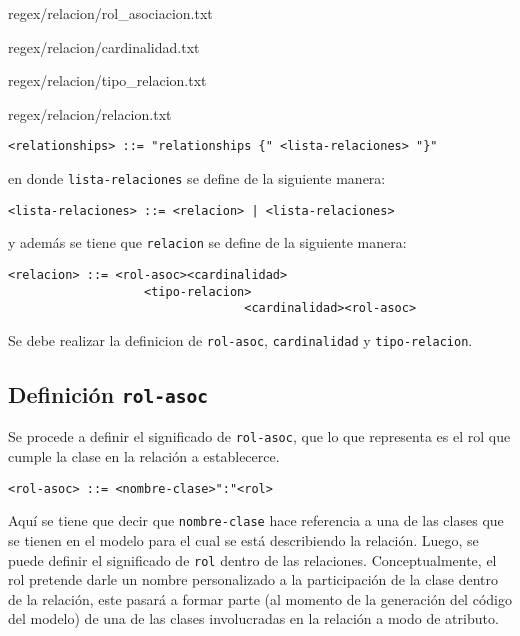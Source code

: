 \begin{lstinputlisting}[basicstyle=\footnotesize\ttfamily, caption={Regex -
  Nombre clase (+Rol) [Relación]},
  label=rerenomclase]{regex/relacion/rol_asociacion.txt}
\begin{lstinputlisting}[basicstyle=\footnotesize\ttfamily, caption={Regex -
  Cardinalidad [Relación]}, label=rerecard]{regex/relacion/cardinalidad.txt}
\begin{lstinputlisting}[basicstyle=\footnotesize\ttfamily, caption={Regex -
  Tipo de Relación [Relación]},
  label=reretiprel]{regex/relacion/tipo_relacion.txt}
\begin{lstinputlisting}[basicstyle=\footnotesize\ttfamily, caption={Regex -
  Relacion},
  label=rerelacion]{regex/relacion/relacion.txt}
\begin{lstlisting}[caption={BNF - Relationships}, basicstyle=\footnotesize\ttfamily]
  <relationships> ::= "relationships {" <lista-relaciones> "}"
\end{lstlisting}

en donde \texttt{lista-relaciones} se define de la siguiente manera:

\begin{lstlisting}[basicstyle=\footnotesize\ttfamily]
  <lista-relaciones> ::= <relacion> | <lista-relaciones>
\end{lstlisting}

y además se tiene que \texttt{relacion} se define de la siguiente manera:

\begin{lstlisting}[caption={BNF - Relación}, basicstyle=\footnotesize\ttfamily]
	<relacion> ::= <rol-asoc><cardinalidad>
	               <tipo-relacion>
								 <cardinalidad><rol-asoc>
\end{lstlisting}

Se debe realizar la definicion de \texttt{rol-asoc}, \texttt{cardinalidad} y
\texttt{tipo-relacion}.

\subsection*{Definición \texttt{rol-asoc}}
Se procede a definir el significado de \texttt{rol-asoc}, que lo que representa
es el rol que cumple la clase en la relación a establecerce.

\begin{lstlisting}[caption={BNF - Rol},basicstyle=\ttfamily\footnotesize]
  <rol-asoc> ::= <nombre-clase>":"<rol>
\end{lstlisting}

Aquí se tiene que decir que \texttt{nombre-clase} hace referencia a una de las
clases que se tienen en el modelo para el cual se está describiendo la
relación. Luego, se puede definir el significado de \texttt{rol} dentro de las
relaciones. Conceptualmente, el rol pretende darle un nombre personalizado a la
participación de la clase dentro de la relación, este pasará a formar parte (al
momento de la generación del código del modelo) de una de las clases
involucradas en la relación a modo de atributo.


\end{lstinputlisting}
\end{lstinputlisting}
\end{lstinputlisting}
\end{lstinputlisting}
